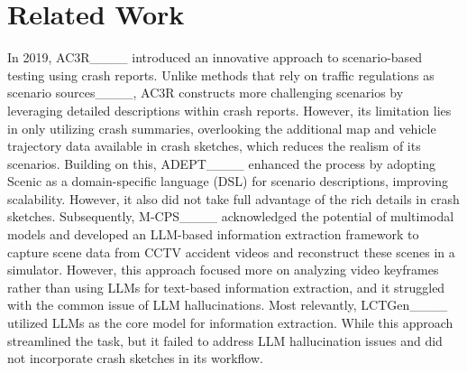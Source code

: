 \section{Related Work}
\label{sec:re_work}

In 2019, AC3R____ introduced an innovative approach to scenario-based testing using crash reports. Unlike methods that rely on traffic regulations as scenario sources____, AC3R constructs more challenging scenarios by leveraging detailed descriptions within crash reports. However, its limitation lies in only utilizing crash summaries, overlooking the additional map and vehicle trajectory data available in crash sketches, which reduces the realism of its scenarios. Building on this, ADEPT____ enhanced the process by adopting Scenic as a domain-specific language (DSL) for scenario descriptions, improving scalability. However, it also did not take full advantage of the rich details in crash sketches. Subsequently, M-CPS____ acknowledged the potential of multimodal models and developed an LLM-based information extraction framework to capture scene data from CCTV accident videos and reconstruct these scenes in a simulator. However, this approach focused more on analyzing video keyframes rather than using LLMs for text-based information extraction, and it struggled with the common issue of LLM hallucinations. Most relevantly, LCTGen____ utilized LLMs as the core model for information extraction. While this approach streamlined the task, but it  failed to address LLM hallucination issues and did not incorporate crash sketches in its workflow.
\vspace{-2mm}
